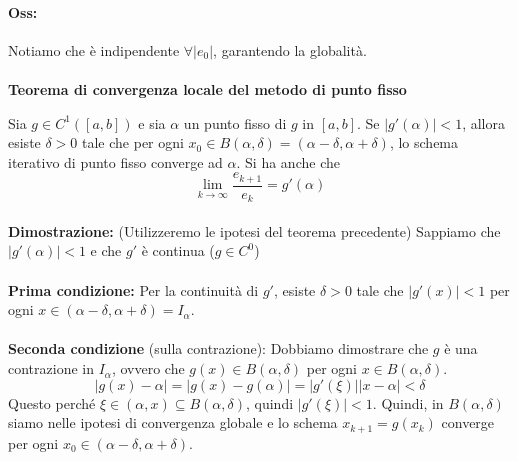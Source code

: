 \documentclass[a4paper, 11pt]{article}
\begin{document}
        \paragraph{Oss:} Notiamo che è indipendente $\forall |e_0|$, garantendo la globalità. 

        \paragraph{}
        \textbf{Teorema di convergenza locale del metodo di punto fisso}

        Sia $g \in C^1([a,b])$ e sia $\alpha$ un punto fisso di $g$ in $[a,b]$.
        Se $|g'(\alpha)| < 1$, allora esiste $\delta > 0$ tale che per ogni $x_0 \in B(\alpha, \delta) = (\alpha - \delta, \alpha + \delta)$, lo schema iterativo di punto fisso converge ad $\alpha$.
        Si ha anche che
        $$
            \lim_{k \to \infty} \frac{e_{k+1}}{e_k} = g'(\alpha)
        $$

        \paragraph{}
        \textbf{Dimostrazione:}
        (Utilizzeremo le ipotesi del teorema precedente)
        Sappiamo che $|g'(\alpha)| < 1$ e che $g'$ è continua ($g \in C^0$)

        \paragraph{}
        \textbf{Prima condizione:}
        Per la continuità di $g'$, esiste $\delta > 0$ tale che $|g'(x)| < 1$ per ogni $x \in (\alpha - \delta, \alpha + \delta) = I_\alpha$.

        \paragraph{}
        \textbf{Seconda condizione }(sulla contrazione):
        Dobbiamo dimostrare che $g$ è una contrazione in $I_\alpha$, ovvero che $g(x) \in B(\alpha, \delta)$ per ogni $x \in B(\alpha, \delta)$.
        $$
        |g(x) - \alpha| = |g(x) - g(\alpha)| = |g'(\xi)| |x - \alpha| < \delta
        $$
        Questo perché $\xi \in (\alpha, x) \subseteq B(\alpha, \delta)$, quindi $|g'(\xi)| < 1$.
        Quindi, in $B(\alpha, \delta)$ siamo nelle ipotesi di convergenza globale e lo schema $x_{k+1} = g(x_k)$ converge per ogni $x_0 \in (\alpha - \delta, \alpha + \delta)$.
\end{document}
